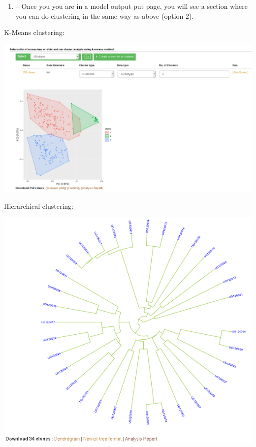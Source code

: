 \documentclass[
  12pt,
]{book}
\providecommand{\tightlist}{%
  \setlength{\itemsep}{0pt}\setlength{\parskip}{0pt}}
\begin{document}
\begin{enumerate}
\def\labelenumi{(\Alph{enumi})}
\tightlist
\item
  -- Once you you are in a model output put page, you will see a section where you can do clustering in the same way as above (option 2).
\end{enumerate}

K-Means clustering:

\begin{center}\includegraphics[width=0.95\linewidth]{assets/images/k-means-cluster} \end{center}

Hierarchical clustering:

\begin{center}\includegraphics[width=0.95\linewidth]{assets/images/hclustering} \end{center}
\end{document}
